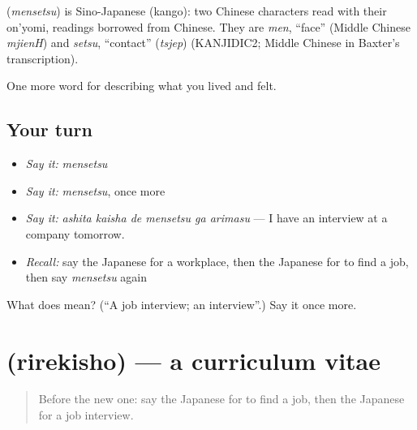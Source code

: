 \begin{cousinweb}
\textbf{} (\emph{mensetsu}) is Sino-Japanese (kango): two Chinese characters read with their on'yomi, readings borrowed from Chinese. They are \emph{men}, \textquotedblleft{}face\textquotedblright{} (Middle Chinese \emph{mjienH}) and \emph{setsu}, \textquotedblleft{}contact\textquotedblright{} (\emph{tsjep}) (KANJIDIC2; Middle Chinese in Baxter's transcription).
\end{cousinweb}

\begin{grammarlens}[title={What you've built}]
One more word for describing what you lived and felt.
\end{grammarlens}

\subsection*{Your turn}
\begin{itemize}
\raggedright
  \item \emph{Say it:} \emph{mensetsu}
  \item \emph{Say it:} \emph{mensetsu}, once more
  \item \emph{Say it:} \emph{ashita kaisha de mensetsu ga arimasu} — I have an interview at a company tomorrow.
  \item \emph{Recall:} say the Japanese for a workplace, then the Japanese for to find a job, then say \emph{mensetsu} again
\end{itemize}

\begin{tcolorbox}[breakable,colback=teal!4,colframe=teal!35!black,title={Before you move on}]
What does  mean? (\textquotedblleft{}A job interview; an interview\textquotedblright{}.) Say it once more.
\end{tcolorbox}
\section[\texorpdfstring{\ja{りれきしょ} (rirekisho)}{りれきしょ (rirekisho)}]{ (rirekisho) — a curriculum vitae}

\label{lesson:JA-C457-rirekisho}



\begin{quote}
Before the new one: say the Japanese for to find a job, then the Japanese for a job interview.
\end{quote}

